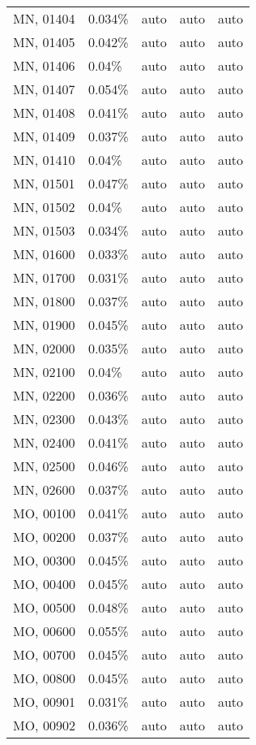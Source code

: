 \begin{longtable}[]{@{}lllll@{}}
MN, 01404 & 0.034\% & auto & auto & auto \\
MN, 01405 & 0.042\% & auto & auto & auto \\
MN, 01406 & 0.04\% & auto & auto & auto \\
MN, 01407 & 0.054\% & auto & auto & auto \\
MN, 01408 & 0.041\% & auto & auto & auto \\
MN, 01409 & 0.037\% & auto & auto & auto \\
MN, 01410 & 0.04\% & auto & auto & auto \\
MN, 01501 & 0.047\% & auto & auto & auto \\
MN, 01502 & 0.04\% & auto & auto & auto \\
MN, 01503 & 0.034\% & auto & auto & auto \\
MN, 01600 & 0.033\% & auto & auto & auto \\
MN, 01700 & 0.031\% & auto & auto & auto \\
MN, 01800 & 0.037\% & auto & auto & auto \\
MN, 01900 & 0.045\% & auto & auto & auto \\
MN, 02000 & 0.035\% & auto & auto & auto \\
MN, 02100 & 0.04\% & auto & auto & auto \\
MN, 02200 & 0.036\% & auto & auto & auto \\
MN, 02300 & 0.043\% & auto & auto & auto \\
MN, 02400 & 0.041\% & auto & auto & auto \\
MN, 02500 & 0.046\% & auto & auto & auto \\
MN, 02600 & 0.037\% & auto & auto & auto \\
MO, 00100 & 0.041\% & auto & auto & auto \\
MO, 00200 & 0.037\% & auto & auto & auto \\
MO, 00300 & 0.045\% & auto & auto & auto \\
MO, 00400 & 0.045\% & auto & auto & auto \\
MO, 00500 & 0.048\% & auto & auto & auto \\
MO, 00600 & 0.055\% & auto & auto & auto \\
MO, 00700 & 0.045\% & auto & auto & auto \\
MO, 00800 & 0.045\% & auto & auto & auto \\
MO, 00901 & 0.031\% & auto & auto & auto \\
MO, 00902 & 0.036\% & auto & auto & auto \\

\end{longtable}
